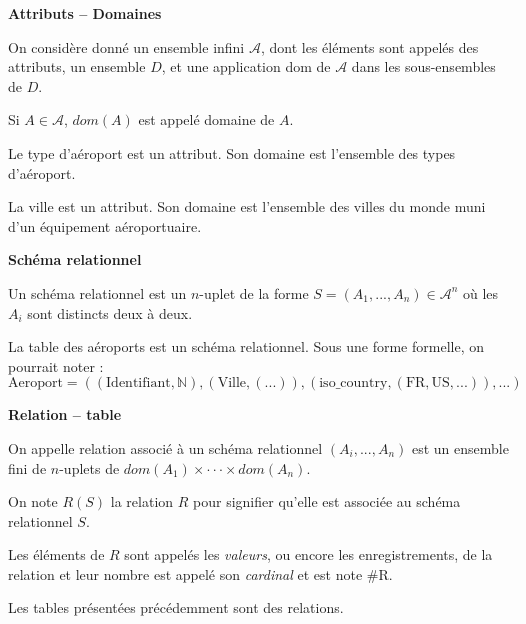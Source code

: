 \documentclass[10pt]{article}
\begin{document}
\begin{defi}
\textbf{Attributs -- Domaines}

On considère donné un ensemble infini $\mathcal{A}$, dont les éléments sont appelés des attributs, un ensemble $D$, et une application dom de $\mathcal{A}$ dans les sous-ensembles de $D$. 

Si $A\in \mathcal{A}$, $dom(A)$ est appelé domaine de $A$.

\end{defi}

\begin{exemple}
Le type d'aéroport est un attribut. Son domaine est l'ensemble des types d'aéroport. 

La ville est un attribut. Son domaine est l'ensemble des villes du monde muni d'un équipement aéroportuaire. 

\end{exemple}

\begin{defi}
\textbf{Schéma relationnel}

Un schéma relationnel est un $n$-uplet de la forme $S=(A_1,...,A_n) \in \mathcal{A}^n$ où les $A_i$ sont distincts deux à deux. 
\end{defi}

\begin{exemple}
La table des aéroports est un schéma relationnel. 
Sous une forme formelle, on pourrait noter :
$$ \text{Aeroport} = \left(\left( \text{Identifiant}, \mathbb{N}\right),\left(\text{Ville}, \left( ...\right)\right), \left(\text{iso\_country},\left(\text{FR},\text{US},... \right)  \right),... \right)$$
\end{exemple}

\begin{defi}
\textbf{Relation -- table}

On appelle relation associé à un schéma relationnel $\left(A_i,...,A_n \right)$ est un ensemble fini de $n$-uplets de $dom(A_1)\times \cdot\cdot\cdot \times dom(A_n)$.

On note $R(S)$ la relation $R$ pour signifier qu'elle est associée au schéma relationnel $S$. 

Les éléments de $R$ sont appelés les \textit{valeurs}, ou encore les enregistrements, de la relation et leur nombre est appelé son \textit{cardinal} et est note \#R.
\end{defi}

\begin{exemple}
Les tables présentées précédemment sont des relations. 
\end{exemple}
\end{document}
